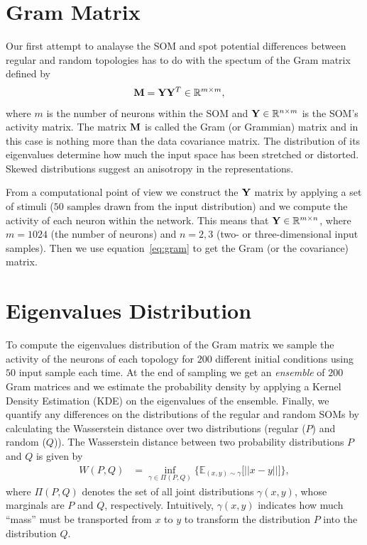 \documentclass[10pt]{article}
\theoremstyle{definition}
\begin{document}
\section{Gram Matrix}%
\label{sec:gram}
Our first attempt to analayse the SOM and spot potential differences between 
regular and random topologies has to do with the spectum of the Gram matrix 
defined by
\begin{align}
    \label{eq:gram}
    {\bf M} &= {\bf Y}{\bf Y}^T \in \mathbb{R}^{m \times m},
\end{align}
where $m$ is the number of neurons within the SOM and ${\bf Y} \in \mathbb{R}^{n \times m}$
is the SOM's activity matrix. The matrix ${\bf M}$ is called the Gram (or Grammian) 
matrix and in this case is nothing more than the data covariance matrix. The
distribution of its eigenvalues determine how much the input space has been
stretched or distorted. Skewed distributions suggest an anisotropy in the 
representations.

From a computational point of view we construct the ${\bf Y}$ matrix by
applying a set of stimuli ($50$ samples drawn from the input distribution) 
and we compute the activity of each neuron within the network. This means that
${\bf Y} \in \mathbb{R}^{m \times n}$, where $m=1024$ (the number of neurons)
and $n={2, 3}$ (two- or three-dimensional input samples). Then we use
equation~\eqref{eq:gram} to get the Gram (or the covariance) matrix. 

\section{Eigenvalues Distribution}%
\label{sec:dist}

To compute the eigenvalues distribution of the Gram matrix we sample
the activity of the neurons of each topology for $200$ different initial
conditions using $50$ input sample each time. 
At the end of sampling we get an \emph{ensemble} of $200$ Gram matrices
and we estimate the probability density by applying a Kernel Density Estimation
(KDE) on the eigenvalues of the ensemble. Finally, we quantify any differences
on the distributions of the regular and random SOMs by calculating the 
Wasserstein distance over two distributions (regular ($P$) and random ($Q$)).
The Wasserstein distance between two probability distributions $P$ and $Q$ is
given by
\begin{align}
    W(P, Q) &= \inf_{\gamma \in \Pi(P, Q)}\{\mathbb{E}_{(x, y)\sim \gamma}\Big[||x -
    y||\Big]\},
\end{align}
where $\Pi(P, Q)$ denotes the set of all joint distributions $\gamma (x, y)$, 
whose marginals are $P$ and $Q$, respectively. Intuitively, $\gamma (x,y)$
indicates  how  much ``mass'' must be transported from $x$ to $y$ to transform
the distribution $P$ into the distribution $Q$. 
\end{document}

